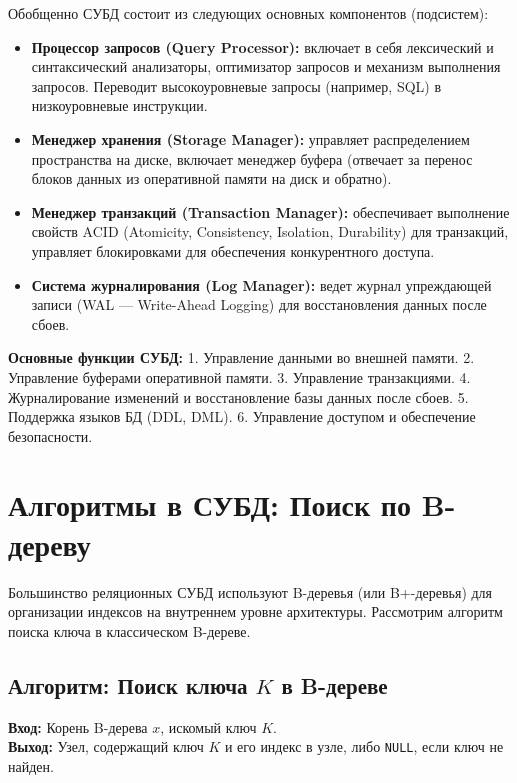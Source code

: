 \documentclass[12pt, a4paper]{article}
\begin{document}
Обобщенно СУБД состоит из следующих основных компонентов (подсистем):

\begin{itemize}
    \item \textbf{Процессор запросов (Query Processor):} включает в себя лексический и синтаксический анализаторы, оптимизатор запросов и механизм выполнения запросов. Переводит высокоуровневые запросы (например, SQL) в низкоуровневые инструкции.
    \item \textbf{Менеджер хранения (Storage Manager):} управляет распределением пространства на диске, включает менеджер буфера (отвечает за перенос блоков данных из оперативной памяти на диск и обратно).
    \item \textbf{Менеджер транзакций (Transaction Manager):} обеспечивает выполнение свойств ACID (Atomicity, Consistency, Isolation, Durability) для транзакций, управляет блокировками для обеспечения конкурентного доступа.
    \item \textbf{Система журналирования (Log Manager):} ведет журнал упреждающей записи (WAL --- Write-Ahead Logging) для восстановления данных после сбоев.
\end{itemize}

\textbf{Основные функции СУБД:}
1. Управление данными во внешней памяти.
2. Управление буферами оперативной памяти.
3. Управление транзакциями.
4. Журналирование изменений и восстановление базы данных после сбоев.
5. Поддержка языков БД (DDL, DML).
6. Управление доступом и обеспечение безопасности.

\section{Алгоритмы в СУБД: Поиск по B-дереву}

Большинство реляционных СУБД используют B-деревья (или B+-деревья) для организации индексов на внутреннем уровне архитектуры. Рассмотрим алгоритм поиска ключа в классическом B-дереве.

\subsection*{Алгоритм: Поиск ключа $K$ в B-дереве}

\textbf{Вход:} Корень B-дерева $x$, искомый ключ $K$. \\
\textbf{Выход:} Узел, содержащий ключ $K$ и его индекс в узле, либо \texttt{NULL}, если ключ не найден.
\end{document}

